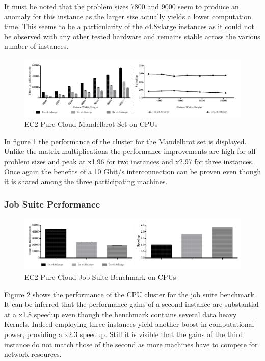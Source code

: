 It must be noted that the problem sizes 7800 and 9000 seem to produce an anomaly for this instance as the larger size actually yields a lower computation time. This seems to be a particularity of the c4.8xlarge instances as it could not be observed with any other tested hardware and remains stable across the various number of instances.

\begin{figure}[H]	
	\includegraphics[width=1.0\textwidth]{images/ec2_cpu_mandelbrot.pdf}
	\centering
	\caption{EC2 Pure Cloud Mandelbrot Set on CPUs}
	\label{img:ec2_cpu_mandelbrot}
\end{figure}

In figure \ref{img:ec2_cpu_mandelbrot} the performance of the cluster for the Mandelbrot set is displayed. Unlike the matrix multiplications the performance improvements are high for all problem sizes and peak at x1.96 for two instances and x2.97 for three instances. Once again the benefits of a 10 Gbit/s interconnection can be proven even though it is shared among the three participating machines. 
\subsubsection*{Job Suite Performance}

\begin{figure}[H]	
	\includegraphics[width=1.0\textwidth]{images/ec2_cpu_full_benchmark.pdf}
	\centering
	\caption{EC2 Pure Cloud Job Suite Benchmark on CPUs}
	\label{img:ec2_cpu_full_benchmark}
\end{figure}

Figure \ref{img:ec2_cpu_full_benchmark} shows the performance of the CPU cluster for the job suite benchmark. It can be inferred that the performance gains of a second instance are substantial at a x1.8 speedup even though the benchmark contains several data heavy Kernels. Indeed employing three instances yield another boost in computational power, providing a x2.3 speedup. Still it is visible that the gains of the third instance do not match those of the second as more machines have to compete for network resources.

